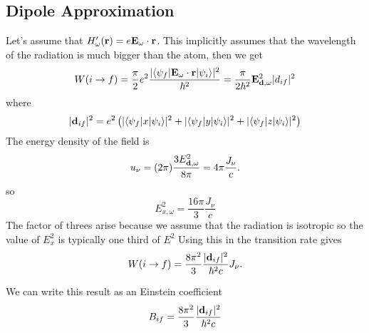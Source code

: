 \subsection{Dipole Approximation}
\label{sec:dipole-approximation}

Let's assume that $H'_\omega({\bf r})=e {\bf E}_{\omega} \cdot {\bf r}$.  This implicitly
assumes that the wavelength of the radiation is much bigger than the
atom, then we get
\begin{equation}
W(i\rightarrow f)=  \frac{\pi}{2}  
e^2 \frac{|\langle\psi_f | {\bf E}_{\omega} \cdot {\bf r} |\psi_i \rangle
  |^2}{\hbar^2} = \frac{\pi}{2{\hbar^2}}  
{\bf E}_{{\bf d}, \omega}^2 |d_{if}|^2
\label{eq:523}
\end{equation}
where
\begin{equation}
|{\bf d}_{if}|^2 = e^2 \left ( |\langle\psi_f | x |\psi_i \rangle |^2 +
|\langle\psi_f | y |\psi_i \rangle |^2 +
|\langle\psi_f | z |\psi_i \rangle |^2 \right )
\label{eq:524}
\end{equation}
The energy density of the field is
\begin{equation}
u_\nu = (2\pi) \frac{3 E_{{\bf d},\omega}^2}{8\pi} = 4\pi \frac{J_\nu}{c}.
\label{eq:525}
\end{equation}
so
\begin{equation}
E_{x,\omega}^2 = \frac{16 \pi}{3} \frac{J_\nu}{c}
\label{eq:526}
\end{equation}
The factor of threes arise because we assume that the radiation is
isotropic so the value of $E_x^2$ is typically one third of $E^2$
Using this in the transition rate gives
\begin{equation}
W(i\rightarrow f)=  \frac{8 \pi^2}{3}  \frac{|{\bf d}_{if}|^2}{\hbar^2 c}
 J_\nu.
\label{eq:527}
\end{equation}

We can write this result as an Einstein coefficient
\begin{equation}
B_{if}=  \frac{8 \pi^2}{3}  \frac{|{\bf d}_{if}|^2}{\hbar^2 c}
\label{eq:528}
\end{equation}

